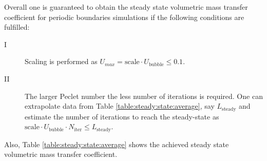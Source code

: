 \documentclass{article}
\newcommand{\ububble}{U_{\mathrm{bubble}}}
\begin{document}
Overall one is guaranteed to obtain the steady state volumetric mass transfer coefficient for
periodic boundaries simulations if the following conditions are fulfilled:
\begin{description}
\item[I] Scaling is performed as $U_{max}=\mathrm{scale}\cdot\ububble\leq 0.1$.
\item[II] The larger Peclet number the less number of iterations is required. One can extrapolate data from Table
\ref{table:steady:state:average}, say $L_{\mathrm{steady}}$ and estimate the  number of
iterations to reach the steady-state as $\mathrm{scale}\cdot \ububble\cdot N_{\mathrm{iter}}\leq L_{\mathrm{steady}}$. 
\end{description}
Also, Table \ref{table:steady:state:average} shows
the achieved steady state volumetric mass transfer coefficient. 
\end{document}
